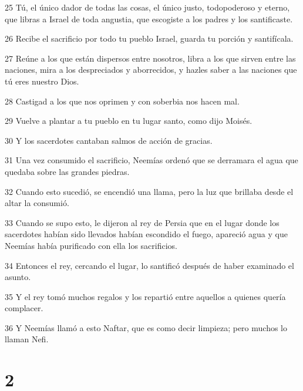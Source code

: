\par 25 Tú, el único dador de todas las cosas, el único justo, todopoderoso y eterno, que libras a Israel de toda angustia, que escogiste a los padres y los santificaste.
\par 26 Recibe el sacrificio por todo tu pueblo Israel, guarda tu porción y santifícala.
\par 27 Reúne a los que están dispersos entre nosotros, libra a los que sirven entre las naciones, mira a los despreciados y aborrecidos, y hazles saber a las naciones que tú eres nuestro Dios.
\par 28 Castigad a los que nos oprimen y con soberbia nos hacen mal.
\par 29 Vuelve a plantar a tu pueblo en tu lugar santo, como dijo Moisés.
\par 30 Y los sacerdotes cantaban salmos de acción de gracias.
\par 31 Una vez consumido el sacrificio, Neemías ordenó que se derramara el agua que quedaba sobre las grandes piedras.
\par 32 Cuando esto sucedió, se encendió una llama, pero la luz que brillaba desde el altar la consumió.
\par 33 Cuando se supo esto, le dijeron al rey de Persia que en el lugar donde los sacerdotes habían sido llevados habían escondido el fuego, apareció agua y que Neemías había purificado con ella los sacrificios.
\par 34 Entonces el rey, cercando el lugar, lo santificó después de haber examinado el asunto.
\par 35 Y el rey tomó muchos regalos y los repartió entre aquellos a quienes quería complacer.
\par 36 Y Neemías llamó a esto Naftar, que es como decir limpieza; pero muchos lo llaman Nefi.

\chapter{2}

